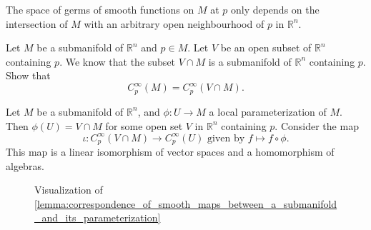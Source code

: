 \documentclass[notoc,notitlepage]{tufte-book}
\begin{document}
The space of germs of smooth functions on $M$ at $p$ only depends on the
intersection of $M$ with an arbitrary open neighbourhood of $p$ in
$\mathbb{R}^n$.

\begin{ex}
  Let $M$ be a submanifold of $\mathbb{R}^n$ and $p \in M$. Let $V$ be an open
  subset of $\mathbb{R}^n$ containing $p$. We know that the subset $V \cap M$ is
  a submanifold of $\mathbb{R}^n$ containing $p$. Show that
  \begin{equation*}
    C_p^\infty(M) = C_p^\infty(V \cap M).
  \end{equation*}
\end{ex}

\begin{lemma}\label{lemma:correspondence_of_smooth_maps_between_a_submanifold_and_its_parameterization}
  Let $M$ be a submanifold of $\mathbb{R}^n$, and $\phi : U \to M$ a local
  parameterization of $M$. Then $\phi(U) = V \cap M$ for some open set $V$ in
  $\mathbb{R}^n$ containing $p$. Consider the map
  \begin{equation*}
    \iota : C_p^\infty(V \cap M) \to C_p^\infty(U) \text{ given by } f \mapsto f
    \circ \phi.
  \end{equation*}
  This map is a linear isomorphism of vector spaces and a homomorphism of
  algebras.
\end{lemma}

\begin{figure}[ht]
  \centering
  \caption{Visualization of
  \cref{lemma:correspondence_of_smooth_maps_between_a_submanifold_and_its_parameterization}}
  \label{fig:visualization_of_correspondence_of_smooth_maps_between_a_submanifold_and_its_parameterization}
\end{figure}
\end{document}
